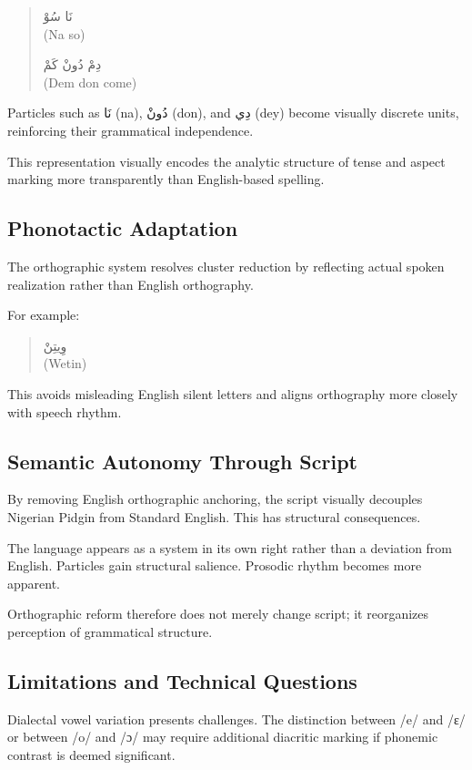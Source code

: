\documentclass[12pt]{article}
\newcommand{\AR}[1]{\foreignlanguage{arabic}{#1}}
\begin{document}
\begin{quote}
\AR{نَا سُوْ} \\
(Na so)

\AR{دِمْ دُونْ كَمْ} \\
(Dem don come)
\end{quote}

Particles such as \AR{نَا} (na), \AR{دُونْ} (don), and \AR{دِي} (dey) become visually discrete units, reinforcing their grammatical independence.

This representation visually encodes the analytic structure of tense and aspect marking more transparently than English-based spelling.

\subsection{Phonotactic Adaptation}

The orthographic system resolves cluster reduction by reflecting actual spoken realization rather than English orthography.

For example:

\begin{quote}
\AR{وِيتِنْ} \\
(Wetin)
\end{quote}

This avoids misleading English silent letters and aligns orthography more closely with speech rhythm.

\subsection{Semantic Autonomy Through Script}

By removing English orthographic anchoring, the script visually decouples Nigerian Pidgin from Standard English. This has structural consequences.

The language appears as a system in its own right rather than a deviation from English. Particles gain structural salience. Prosodic rhythm becomes more apparent.

Orthographic reform therefore does not merely change script; it reorganizes perception of grammatical structure.

\subsection{Limitations and Technical Questions}

Dialectal vowel variation presents challenges. The distinction between /e/ and /ɛ/ or between /o/ and /ɔ/ may require additional diacritic marking if phonemic contrast is deemed significant.
\end{document}
